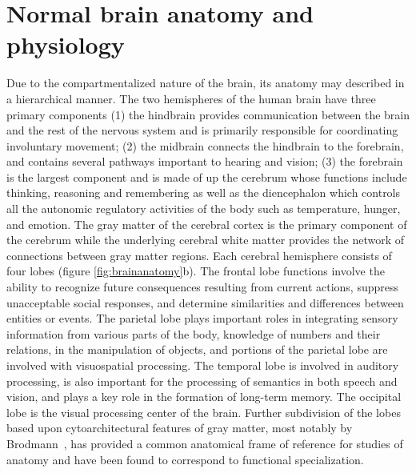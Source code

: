 \section{Normal brain anatomy and physiology}
Due to the compartmentalized nature of the brain, its anatomy may described in a hierarchical manner. The two hemispheres of the human brain have three primary components (1) the hindbrain provides communication between the brain and the rest of the nervous system and is primarily responsible for coordinating involuntary movement; (2) the midbrain connects the hindbrain to the forebrain, and contains several pathways important to hearing and vision; (3) the forebrain is the largest component and is made of up the cerebrum whose functions include thinking, reasoning and remembering as well as the diencephalon which controls all the autonomic regulatory activities of the body such as temperature, hunger, and emotion. The gray matter of the cerebral cortex is the primary component of the cerebrum while the underlying cerebral white matter provides the network of connections between gray matter regions. Each cerebral hemisphere consists of four lobes (figure \ref{fig:brainanatomy}b). The frontal lobe functions involve the ability to recognize future consequences resulting from current actions, suppress unacceptable social responses, and determine similarities and differences between entities or events. The parietal lobe plays important roles in integrating sensory information from various parts of the body, knowledge of numbers and their relations, in the manipulation of objects, and portions of the parietal lobe are involved with visuospatial processing. The temporal lobe is involved in auditory processing, is also important for the processing of semantics in both speech and vision, and plays a key role in the formation of long-term memory. The occipital lobe is the visual processing center of the brain. Further subdivision of the lobes based upon cytoarchitectural features of gray matter, most notably by Brodmann~\cite{Brodmann1909}, has provided a common anatomical frame of reference for studies of anatomy and have been found to correspond to functional specialization.

